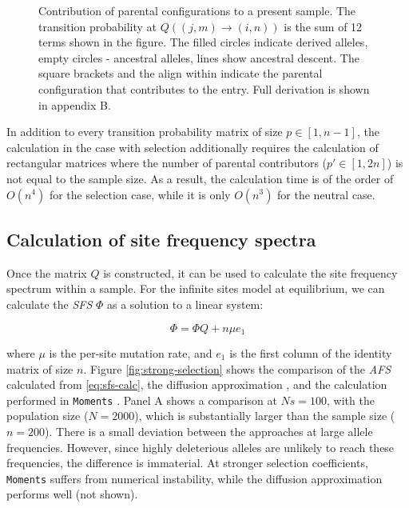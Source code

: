 \documentclass[review]{elsarticle}
\newcommand{\ra}{\rightarrow}
\begin{document}
\begin{figure}
  \caption{Contribution of parental configurations to a present sample. The transition probability
    at $Q((j,m)\ra(i,n))$ is the sum of 12 terms shown in the figure. The filled circles indicate
    derived alleles, empty circles - ancestral alleles, lines show ancestral descent. The square
    brackets and the align within indicate the parental configuration that contributes to the
    entry. Full derivation is shown in appendix B.}
  \label{fig:recurrence}
\end{figure}

In addition to every transition probability matrix of size $p \in [1, n-1]$, the calculation in the
case with selection additionally requires the calculation of rectangular matrices where the number
of parental contributors ($p' \in [1, 2n]$) is not equal to the sample size. As a result, the
calculation time is of the order of $O(n^4)$ for the selection case, while it is only $O(n^3)$ for
the neutral case.

\subsection{Calculation of site frequency spectra}
\label{subsec:afs}

Once the matrix $Q$ is constructed, it can be used to calculate the site frequency spectrum within a
sample. For the infinite sites model at equilibrium, we can calculate the \textit{SFS} $\Phi$ as a
solution to a linear system:

\begin{equation}
  \label{eq:sfs-calc}
\Phi = \Phi Q + n \mu e_1
\end{equation}

where $\mu$ is the per-site mutation rate, and $e_1$ is the first column of the identity matrix of
size $n$. Figure \ref{fig:strong-selection} shows the comparison of the \textit{AFS} calculated from
\eqref{eq:sfs-calc}, the diffusion approximation \cite[eq. 9.23]{Ewens2004}, and the calculation
performed in \texttt{Moments} \cite{JouganousEtAl2017}. Panel A shows a comparison at $Ns=100$, with
the population size ($N=2000$), which is substantially larger than the sample size ($n=200$). There
is a small deviation between the approaches at large allele frequencies. However, since highly
deleterious alleles are unlikely to reach these frequencies, the difference is immaterial. At
stronger selection coefficients, \texttt{Moments} suffers from numerical instability, while the
diffusion approximation performs well (not shown).
\end{document}

